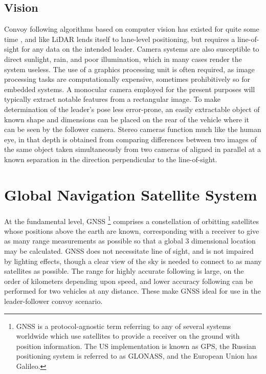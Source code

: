 \documentclass[12pt]{report}
\begin{document}
\subsection{Vision}
Convoy following algorithms based on computer vision has existed for quite some time \cite{visionrec}, and like LiDAR lends itself to lane-level positioning, but requires a line-of-sight for any data on the intended leader. Camera systems are also susceptible to direct sunlight, rain, and poor illumination, which in many cases render the system useless. The use of a graphics processing unit is often required, as image processing tasks are computationally expensive, sometimes prohibitively so for embedded systems.
A monocular camera employed for the present purposes will typically extract notable features from a rectangular image. To make determination of the leader's pose less error-prone, an easily extractable object of known shape and dimensions can be placed on the rear of the vehicle where it can be seen by the follower camera.
Stereo cameras function much like the human eye, in that depth is obtained from comparing differences between two images of the same object taken simultaneously from two cameras of aligned in parallel at a known separation in the direction perpendicular to the line-of-sight.


\section{Global Navigation Satellite System}

At the fundamental level, GNSS
\footnote{GNSS is a protocol-agnostic term referring to any of several systems worldwide which use satellites to provide a receiver on the ground with position information. The US implementation is known as GPS, the Russian positioning system is referred to as GLONASS, and the European Union has Galileo.}
comprises a constellation of orbitting satellites whose positions above the earth are known, corresponding with a receiver to give as many range measurements as possible so that a global 3 dimensional location may be calculated. GNSS does not necessitate line of sight, and is not impaired by lighting effects, though a clear view of the sky is needed to connect to as many satellites as possible. The range for highly accurate following is large, on the order of kilometers depending upon speed, and lower accuracy following can be performed for two vehicles at any distance. These make GNSS ideal for use in the leader-follower convoy scenario.
\end{document}
